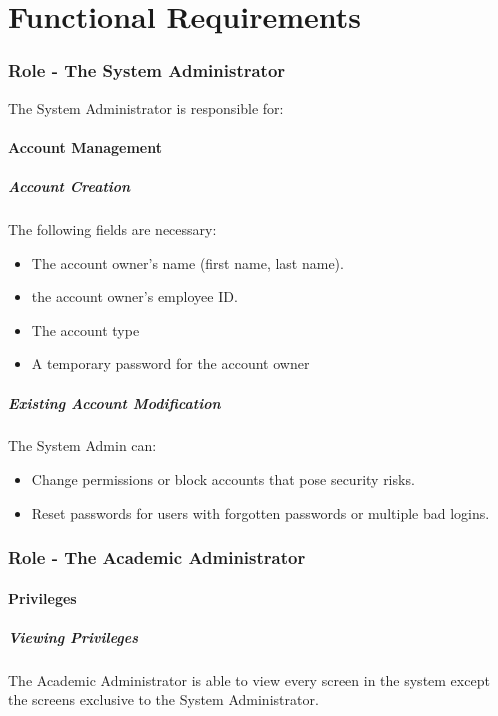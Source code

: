 \documentclass{article}
\begin{document}
\part{Functional Requirements}
\section{Role - The System Administrator \label{SysAdmin}}
The System Administrator is responsible for:
\subsection{Account Management}
\subsubsection{Account Creation \label{Account Creation}}
The following fields are necessary:
\begin{itemize}
  \item The account owner's name (first name, last name).
  \item the account owner's employee ID.
  \item The account type
  \item A temporary password for the account owner
\end{itemize}
\subsubsection{Existing Account Modification \label{AccountMod}}
The System Admin can:
\begin{itemize}
  \item Change permissions or block accounts that pose security risks.
  \item Reset passwords for users with forgotten passwords or multiple bad logins.
\end{itemize}

\section{Role - The Academic Administrator \label{AcAdmin}}
\subsection{Privileges}
\subsubsection{Viewing Privileges}
The Academic Administrator is able to view every screen in the system except the screens exclusive to the System Administrator.
\end{document}
